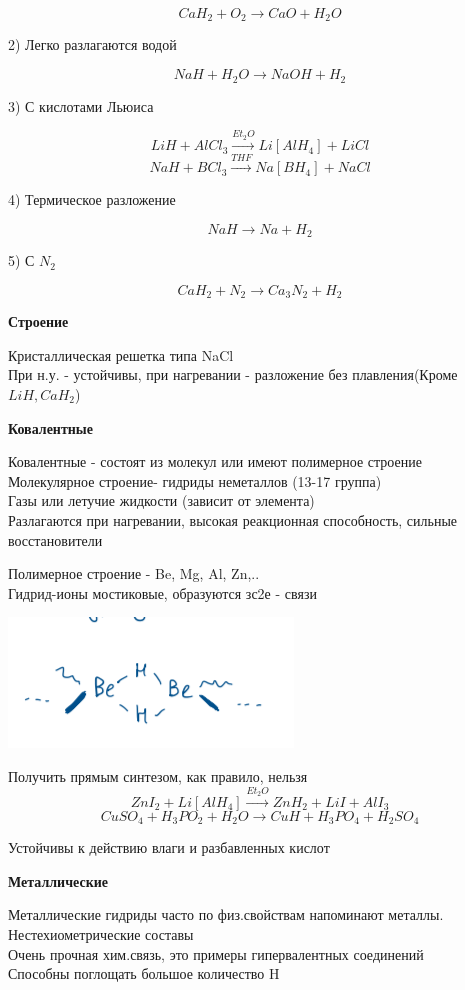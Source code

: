 \documentclass[14pt,a4paper]{scrartcl}
\begin{document}
$$CaH_2 + O_2 \rightarrow CaO + H_2O$$

2) Легко разлагаются водой

$$NaH + H_2O \rightarrow NaOH + H_2$$

3) С кислотами Льюиса

$$LiH + AlCl_3 \xrightarrow{Et_2O} Li[AlH_4] + LiCl$$
$$NaH + BCl_3 \xrightarrow{THF} Na[BH_4] + NaCl$$

4) Термическое разложение

$$NaH \rightarrow Na + H_2$$

5) С $N_2$

$$CaH_2 + N_2 \rightarrow Ca_3N_2 + H_2$$

\textbf{Строение}

Кристаллическая решетка типа NaCl\\
При н.у. - устойчивы, при нагревании - разложение без плавления(Кроме $LiH, CaH_2$)

\textbf{Ковалентные}

Ковалентные - состоят из молекул или имеют полимерное строение\\
Молекулярное строение- гидриды неметаллов (13-17 группа)\\
Газы или летучие жидкости (зависит от элемента)\\
Разлагаются при нагревании, высокая реакционная способность, сильные восстановители

Полимерное строение - Be, Mg, Al, Zn,..\\
Гидрид-ионы мостиковые, образуются зс2е - связи

\includegraphics{12v1.png}

Получить прямым синтезом, как правило, нельзя\\
$$ZnI_2 + Li[AlH_4] \xrightarrow{Et_2O} ZnH_2 + LiI + AlI_3$$
$$CuSO_4 + H_3PO_2 + H_2O \rightarrow CuH + H_3PO_4 + H_2SO_4$$

Устойчивы к действию влаги и разбавленных кислот


\textbf{Металлические}

Металлические гидриды часто по физ.свойствам напоминают металлы.\\
Нестехиометрические составы\\
Очень прочная хим.связь, это примеры гипервалентных соединений\\
Способны поглощать большое количество H
\end{document}
